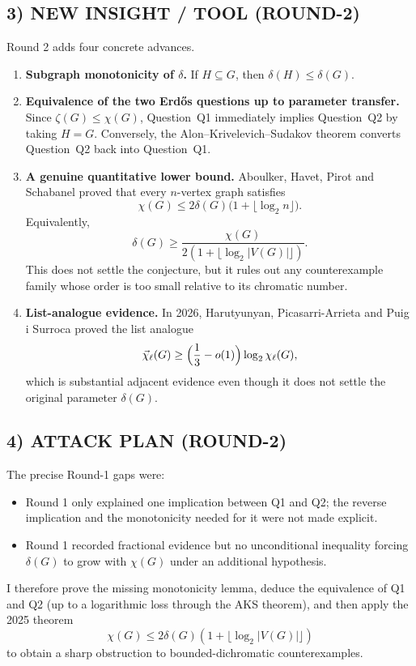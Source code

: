 \subsection*{3) NEW INSIGHT / TOOL (ROUND-2)}
Round 2 adds four concrete advances.
\begin{enumerate}
\item[(i)] \textbf{Subgraph monotonicity of $\delta$.} If $H\subseteq G$, then $\delta(H)\le \delta(G)$.
\item[(ii)] \textbf{Equivalence of the two Erd\H{o}s questions up to parameter transfer.} Since $\zeta(G)\le \chi(G)$, Question~Q1 immediately implies Question~Q2 by taking $H=G$. Conversely, the Alon--Krivelevich--Sudakov theorem converts Question~Q2 back into Question~Q1.
\item[(iii)] \textbf{A genuine quantitative lower bound.} Aboulker, Havet, Pirot and Schabanel proved that every $n$-vertex graph satisfies
\[
\chi(G)\le 2\delta(G)\bigl(1+\lfloor\log_2 n\rfloor\bigr).
\]
Equivalently,
\[
\delta(G)\ge \frac{\chi(G)}{2(1+\lfloor\log_2 |V(G)|\rfloor)}.
\]
This does not settle the conjecture, but it rules out any counterexample family whose order is too small relative to its chromatic number.
\item[(iv)] \textbf{List-analogue evidence.} In 2026, Harutyunyan, Picasarri-Arrieta and Puig i Surroca proved the list analogue
\[
\vec\chi_\ell(G)\ge \Bigl(\frac13-o(1)\Bigr)\log_2 \chi_\ell(G),
\]
which is substantial adjacent evidence even though it does not settle the original parameter $\delta(G)$.
\end{enumerate}

\subsection*{4) ATTACK PLAN (ROUND-2)}
The precise Round-1 gaps were:
\begin{itemize}
\item Round 1 only explained one implication between Q1 and Q2; the reverse implication and the monotonicity needed for it were not made explicit.
\item Round 1 recorded fractional evidence but no unconditional inequality forcing $\delta(G)$ to grow with $\chi(G)$ under an additional hypothesis.
\end{itemize}
I therefore prove the missing monotonicity lemma, deduce the equivalence of Q1 and Q2 (up to a logarithmic loss through the AKS theorem), and then apply the 2025 theorem
\[
\chi(G)\le 2\delta(G)(1+\lfloor\log_2 |V(G)|\rfloor)
\]
to obtain a sharp obstruction to bounded-dichromatic counterexamples.

